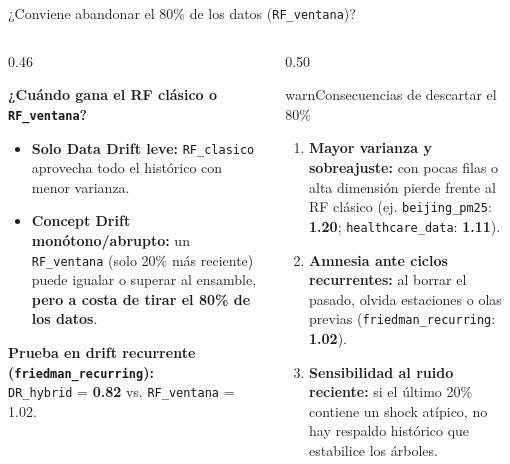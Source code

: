 \documentclass[aspectratio=169,11pt,table]{beamer}
\begin{document}
\begin{frame}{¿Conviene abandonar el 80\% de los datos (\texttt{RF\_ventana})?}
\begin{columns}[T,onlytextwidth]
\begin{column}{0.46\textwidth}
\begin{ccdebox}
\scriptsize
\textbf{¿Cuándo gana el RF clásico o \texttt{RF\_ventana}?}\\[0.06cm]
\begin{itemize}
  \item \textbf{Solo Data Drift leve:} \texttt{RF\_clasico} aprovecha todo el histórico con menor varianza.
  \item \textbf{Concept Drift monótono/abrupto:} un \texttt{RF\_ventana} (solo 20\% más reciente) puede igualar o superar al ensamble, \textbf{pero a costa de tirar el 80\% de los datos}.
\end{itemize}
\vspace{0.06cm}
\textbf{Prueba en drift recurrente (\texttt{friedman\_recurring}):}\\
\texttt{DR\_hybrid} = \textbf{0.82} vs. \texttt{RF\_ventana} = 1.02.
\end{ccdebox}
\end{column}

\begin{column}{0.50\textwidth}
\begin{contrastbox}{warn}{Consecuencias de descartar el 80\%}
\scriptsize
\begin{enumerate}
  \item \textbf{Mayor varianza y sobreajuste:} con pocas filas o alta dimensión pierde frente al RF clásico (ej. \texttt{beijing\_pm25}: \textbf{1.20}; \texttt{healthcare\_data}: \textbf{1.11}).
  \item \textbf{Amnesia ante ciclos recurrentes:} al borrar el pasado, olvida estaciones o olas previas (\texttt{friedman\_recurring}: \textbf{1.02}).
  \item \textbf{Sensibilidad al ruido reciente:} si el último 20\% contiene un shock atípico, no hay respaldo histórico que estabilice los árboles.
\end{enumerate}
\end{contrastbox}
\end{column}
\end{columns}
\end{frame}

\end{document}
